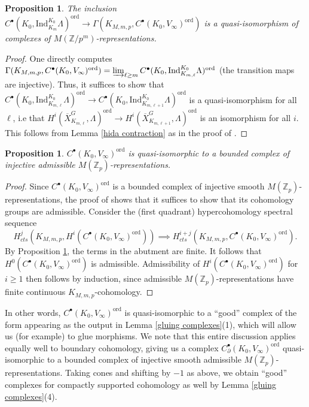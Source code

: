 \documentclass{amsart}
\newtheorem{prop}[subsubsection]{Proposition}
\theoremstyle{remark}
\numberwithin{equation}{subsection}
\newcommand{\Z}{\ZZ}
\newcommand{\ZZ}{{\mathbb Z}}
\newcommand{\Zp}{\Z_p}
\newcommand{\ol}{\overline}
\renewcommand{\(}{\left(}
\renewcommand{\)}{\right)}
\begin{document}
\begin{prop}\label{ordinary finiteness}
The inclusion $C^\bullet(K_0,\mathrm{Ind}_{K_m}^{K_0}\Lambda)^\mathrm{ord} \to \Gamma(K_{M,m,p},C^\bullet(K_0, V_\infty)^\mathrm{ord})$ is a quasi-isomorphism of complexes of $M(\Z/p^m)$-representations.
\end{prop}

\begin{proof}
One directly computes $\Gamma(K_{M,m,p},C^\bullet(K_0, V_\infty)^\mathrm{ord}) = \varinjlim_{\ell\geq m} C^\bullet(K_0,\mathrm{Ind}_{K_{m,\ell}}^{K_0}\Lambda)^\mathrm{ord}$ (the transition maps are injective). Thus, it suffices to show that $C^\bullet(K_0,\mathrm{Ind}_{K_{m,\ell}}^{K_0}\Lambda)^\mathrm{ord} \to C^\bullet(K_0,\mathrm{Ind}_{K_{m,\ell+1}}^{K_0}\Lambda)^\mathrm{ord}$ is a quasi-isomorphism for all $\ell$, i.e that $H^i(\ol{X}_{K_{m,\ell}}^G,\Lambda)^\mathrm{ord} \to H^i(\ol{X}_{K_{m,\ell+1}}^G,\Lambda)^\mathrm{ord}$ is an isomorphism for all $i$. This follows from Lemma \ref{hida contraction} as in the proof of \cite[Lemma 6.10]{khare-thorne}.
\end{proof}

\begin{prop}\label{hida admissibility}
$C^\bullet(K_0, V_\infty)^\mathrm{ord}$ is quasi-isomorphic to a bounded complex of injective admissible $M(\Zp)$-representations. 
\end{prop}

\begin{proof}
Since $C^\bullet(K_0, V_\infty)^\mathrm{ord}$ is a bounded complex of injective smooth $M(\Zp)$-representations, the proof of \cite[Chapter II, \S 5, Lemma 1]{mumford} shows that it suffices to show that its cohomology groups are admissible. Consider the (first quadrant) hypercohomology spectral sequence
\[
H^j_{cts}(K_{M,m,p},H^i(C^\bullet(K_0, V_\infty)^\mathrm{ord})) \implies H_{cts}^{i+j}(K_{M,m,p},C^\bullet(K_0, V_\infty)^\mathrm{ord}).
\]
By Proposition \ref{ordinary finiteness}, the terms in the abutment are finite. It follows that $H^0(C^\bullet(K_0, V_\infty)^\mathrm{ord})$ is admissible. Admissibility of $H^i(C^\bullet(K_0, V_\infty)^\mathrm{ord})$ for $i\geq 1$ then follows by induction, since admissible $M(\Zp)$-representations have finite continuous $K_{M,m,p}$-cohomology.
\end{proof}

In other words, $C^\bullet(K_0, V_\infty)^\mathrm{ord}$ is quasi-isomorphic to a ``good'' complex of the form appearing as the output in Lemma \ref{gluing complexes}(1),
which will allow us (for example) to glue morphisms. We note that this entire discussion applies equally well to boundary cohomology, giving us a complex $C_\partial^\bullet(K_0, V_\infty)^\mathrm{ord}$ quasi-isomorphic to a bounded complex of injective smooth admissible $M(\Zp)$-representations. Taking cones and shifting by $-1$ as above, we obtain ``good'' complexes for compactly supported cohomology as well by Lemma \ref{gluing complexes}(4).
\end{document}
